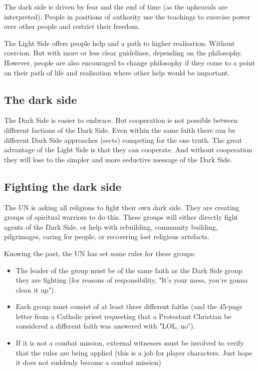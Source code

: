 The dark side is driven by fear and the end of time (as the upheavals are interpreted). People in positions of authority use the teachings to exercise power over other people and restrict their freedom.

The Light Side offers people help and a path to higher realisation. Without coercion. But with more or less clear guidelines, depending on the philosophy. However, people are also encouraged to change philosophy if they come to a point on their path of life and realisation where other help would be important.

\subsection{The dark side}

The Dark Side is easier to embrace. But cooperation is not possible between different factions of the Dark Side. Even within the same faith there can be different Dark Side approaches (sects) competing for the one truth.
The great advantage of the Light Side is that they can cooperate. And without cooperation they will lose to the simpler and more seductive message of the Dark Side.

\subsection{Fighting the dark side}

The UN is asking all religions to fight their own dark side. They are creating groups of spiritual warriors to do this. These groups will either directly fight agents of the Dark Side, or help with rebuilding, community building, pilgrimages, caring for people, or recovering lost religious artefacts.

Knowing the past, the UN has set some rules for these groups:

\begin{itemize}
    \item The leader of the group must be of the same faith as the Dark Side group they are fighting (for reasons of responsibility, "It's your mess, you're gonna clean it up").
    \item Each group must consist of at least three different faiths (and the 45-page letter from a Catholic priest requesting that a Protestant Christian be considered a different faith was answered with "LOL, no").
    \item If it is not a combat mission, external witnesses must be involved to verify that the rules are being applied (this is a job for player characters. Just hope it does not suddenly become a combat mission)
\end{itemize}

